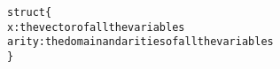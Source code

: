 \documentclass[12pt]{article}
\begin{document}
\begin{program}
\begin{alltt}
struct \{
x: the vector of all the variables 
arity: the domain and arities of all the variables
\}
\end{alltt}
\caption{$nodeArityAttribute$}
\label{struct}
\end{program}
%
%
%
%
\end{document}
